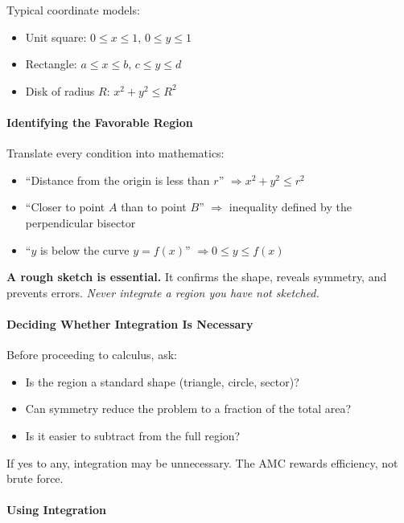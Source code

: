 \documentclass[12pt]{extarticle}
\begin{document}
Typical coordinate models:
\begin{itemize}
    \item Unit square: $0 \le x \le 1$, $0 \le y \le 1$
    \item Rectangle: $a \le x \le b$, $c \le y \le d$
    \item Disk of radius $R$: $x^2 + y^2 \le R^2$
\end{itemize}

\paragraph{Identifying the Favorable Region}

Translate every condition into mathematics:
\begin{itemize}
    \item ``Distance from the origin is less than $r$'' $\Rightarrow x^2 + y^2 \le r^2$
    \item ``Closer to point $A$ than to point $B$'' $\Rightarrow$ inequality defined by the perpendicular bisector
    \item ``$y$ is below the curve $y = f(x)$'' $\Rightarrow 0 \le y \le f(x)$
\end{itemize}

\textbf{A rough sketch is essential.} It confirms the shape, reveals symmetry, and prevents errors. \textit{Never integrate a region you have not sketched.}

\paragraph{Deciding Whether Integration Is Necessary}

Before proceeding to calculus, ask:
\begin{itemize}
    \item Is the region a standard shape (triangle, circle, sector)?
    \item Can symmetry reduce the problem to a fraction of the total area?
    \item Is it easier to subtract from the full region?
\end{itemize}

If yes to any, integration may be unnecessary. The AMC rewards efficiency, not brute force.

\paragraph{Using Integration}
\end{document}
